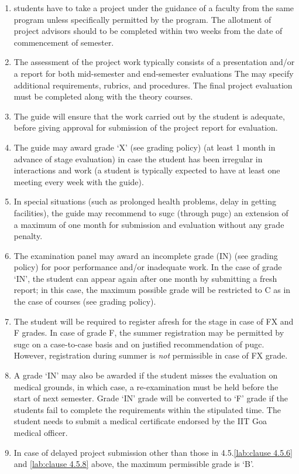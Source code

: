 \begin {enumerate}[leftmargin=15mm]
    \item \Glspl{student} have to take a project under the guidance of a \gls{faculty} from the same program unless specifically permitted by the \gls{program}. The allotment of project advisors should to be completed within two weeks from the date of commencement of semester.
    \item The assessment of the project work typically consists of a presentation and/or a report for both mid-semester and end-semester evaluations The  may specify additional requirements, rubrics, and procedures. The final project evaluation must be completed along with the theory courses. 
    \item The guide will ensure that the work carried out by the \gls{student} is adequate, before giving approval for submission of the project report for evaluation. 
    \item The guide may award grade ‘X' (see grading policy) (at least 1 month in advance of stage evaluation) in case the \gls{student} has been irregular in interactions and work (a \gls{student} is typically expected to have at least one meeting every week with the guide). 
    \item In special situations (such as prolonged health problems, delay in getting facilities), the guide may recommend to \acrshort{sugc} (through \acrshort{pugc}) an extension of a maximum of one month for submission and evaluation without any grade penalty. 
    \item \label{lab:clause 4.5.6} The examination panel may award an incomplete grade (IN) (see grading policy) for poor performance and/or inadequate work. In the case of grade ‘IN’, the \gls{student} can appear again after one month by submitting a fresh report; in this case, the maximum possible grade will be restricted to C as in the case of courses (see grading policy).
    \item The \gls{student} will be required to register afresh for the stage in case of FX and F grades. In case of grade F, the summer registration may be permitted by \acrshort{sugc} on a case-to-case basis and on justified recommendation of \acrshort{pugc}. However, registration during summer is \textit{not} permissible in case of FX grade. 
    \item \label{lab:clause 4.5.8} A grade ‘IN’ may also be awarded if the student misses the evaluation on medical grounds, in which case, a re-examination must be held before the start of next semester. Grade ‘IN’ grade will be converted to ‘F’ grade if the \glspl{student} fail to complete the requirements within the stipulated time. The \gls{student} needs to submit a medical certificate endorsed by the IIT Goa medical officer.
    \item In case of delayed project submission other than those in 4.5.\ref{lab:clause 4.5.6} and \ref{lab:clause 4.5.8} above, the maximum permissible grade is ‘B’.
\end{enumerate}

